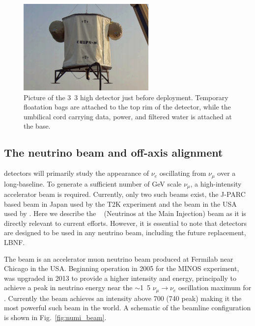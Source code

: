 \begin{figure} %
    \includegraphics[width=0.6\textwidth]{diagrams/4-chips/chips_m.png}
    \caption[Picture of the \chipsm detector]
    {Picture of the \unit{3.3}{} high \chipsm detector just before deployment. Temporary
        floatation bags are attached to the top rim of the detector, while the umbilical cord
        carrying data, power, and filtered water is attached at the base.}
    \label{fig:chips_m}
\end{figure}

\subsection{The neutrino beam and off-axis alignment} %
\label{sec:chips_concept_beam} %

\chips detectors will primarily study the appearance of $\nu_{e}$ oscillating from $\nu_{\mu}$
over a long-baseline. To generate a sufficient number of GeV scale $\nu_{\mu}$, a high-intensity
accelerator beam is required. Currently, only two such beams exist, the J-PARC based beam in Japan
used by the T2K experiment and the \numi beam in the USA used by \nova. Here we describe the
\numi~\cite{adamson2016} (Neutrinos at the Main Injection) beam as it is directly relevant to
current \chips efforts. However, it is essential to note that \chips detectors are designed to be
used in any neutrino beam, including the future \numi replacement, LBNF.

The \numi beam is an accelerator muon neutrino beam produced at Fermilab near Chicago in the USA.
Beginning operation in 2005 for the MINOS experiment, \numi was upgraded in 2013 to provide a
higher intensity and energy, principally to achieve a peak in neutrino energy near the
$\sim$\unit{1.5}{\GeV} $\nu_{\mu}\rightarrow\nu_{e}$ oscillation maximum for \nova. Currently the
\numi beam achieves an intensity above \unit{700}{} (\unit{740}{} peak)
making it the most powerful such beam in the world. A schematic of the \numi beamline
configuration is shown in Fig.~\ref{fig:numi_beam}.

